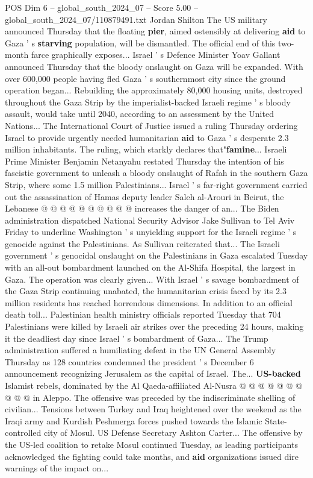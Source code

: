 \begin{textsample}{POS Dim 6 – global\_south\_2024\_07 – Score 5.00 – global\_south\_2024\_07/110879491.txt}  \label{ex:f6_pos_316}
Jordan Shilton The US military announced Thursday that the floating \textbf{pier}, aimed ostensibly at delivering \textbf{aid} to Gaza ' s \textbf{starving} population, will be dismantled.
The official end of this two-month farce graphically exposes...
Israel ' s Defence Minister Yoav Gallant announced Thursday that the bloody onslaught on Gaza will be expanded.
With over 600,000 people having fled Gaza ' s southernmost city since the ground operation began...
Rebuilding the approximately 80,000 housing units, destroyed throughout the Gaza Strip by the imperialist-backed Israeli regime ' s bloody assault, would take until 2040, according to an assessment by the United Nations...
The International Court of Justice issued a ruling Thursday ordering Israel to provide urgently needed humanitarian \textbf{aid} to Gaza ' s desperate 2.3 million inhabitants.
The ruling, which starkly declares that"\textbf{famine}...
Israeli Prime Minister Benjamin Netanyahu restated Thursday the intention of his fascistic government to unleash a bloody onslaught of Rafah in the southern Gaza Strip, where some 1.5 million Palestinians...
Israel ' s far-right government carried out the assassination of Hamas deputy leader Saleh al-Arouri in Beirut, the Lebanese @ @ @ @ @ @ @ @ @ @ increases the danger of an...
The Biden administration dispatched National Security Advisor Jake Sullivan to Tel Aviv Friday to underline Washington ' s unyielding support for the Israeli regime ' s genocide against the Palestinians.
As Sullivan reiterated that...
The Israeli government ' s genocidal onslaught on the Palestinians in Gaza escalated Tuesday with an all-out bombardment launched on the Al-Shifa Hospital, the largest in Gaza.
The operation was clearly given...
With Israel ' s savage bombardment of the Gaza Strip continuing unabated, the humanitarian crisis faced by its 2.3 million residents has reached horrendous dimensions.
In addition to an official death toll...
Palestinian health ministry officials reported Tuesday that 704 Palestinians were killed by Israeli air strikes over the preceding 24 hours, making it the deadliest day since Israel ' s bombardment of Gaza...
The Trump administration suffered a humiliating defeat in the UN General Assembly Thursday as 128 countries condemned the president ' s December 6 announcement recognizing Jerusalem as the capital of Israel.
The... \textbf{US-backed} Islamist rebels, dominated by the Al Qaeda-affiliated Al-Nusra @ @ @ @ @ @ @ @ @ @ in Aleppo.
The offensive was preceded by the indiscriminate shelling of civilian...
Tensions between Turkey and Iraq heightened over the weekend as the Iraqi army and Kurdish Peshmerga forces pushed towards the Islamic State-controlled city of Mosul.
US Defense Secretary Ashton Carter...
The offensive by the US-led coalition to retake Mosul continued Tuesday, as leading participants acknowledged the fighting could take months, and \textbf{aid} organizations issued dire warnings of the impact on...

\end{textsample}
